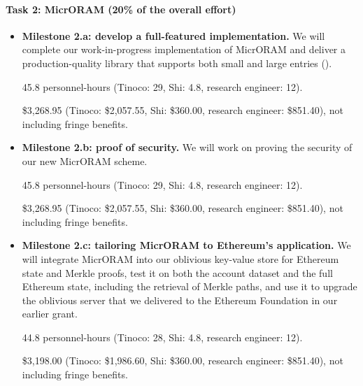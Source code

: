 \paragraph{Task 2: MicrORAM (20\% of the overall effort)}
\begin{itemize}
\item {\bf Milestone 2.a: develop a full-featured implementation.}
We will complete our work-in-progress implementation of MicrORAM and
deliver a production-quality library that supports both small and large
entries ().

\vspace{5pt}
 45.8 personnel-hours (Tinoco: 29,
Shi: 4.8, research engineer: 12).

\vspace{5pt}
 \$3,268.95 (Tinoco: \$2,057.55, Shi: \$360.00,
research engineer: \$851.40), not including fringe benefits.

\item {\bf Milestone 2.b: proof of security.}
We will work on proving the security of our new MicrORAM scheme.

\vspace{5pt}
 45.8 personnel-hours (Tinoco: 29,
Shi: 4.8, research engineer: 12).

\vspace{5pt}
 \$3,268.95 (Tinoco: \$2,057.55, Shi: \$360.00,
research engineer: \$851.40), not including fringe benefits.

\item {\bf Milestone 2.c: tailoring MicrORAM to Ethereum's application.}
We will integrate MicrORAM into our oblivious key-value store for Ethereum
state and Merkle proofs, test it on both the account dataset and the full
Ethereum state, including the retrieval of Merkle paths, and use it to
upgrade the oblivious server that we delivered to the Ethereum Foundation
in our earlier grant.

\vspace{5pt}
 44.8 personnel-hours (Tinoco: 28,
Shi: 4.8, research engineer: 12).

\vspace{5pt}
 \$3,198.00 (Tinoco: \$1,986.60, Shi: \$360.00,
research engineer: \$851.40), not including fringe benefits.
\end{itemize}
